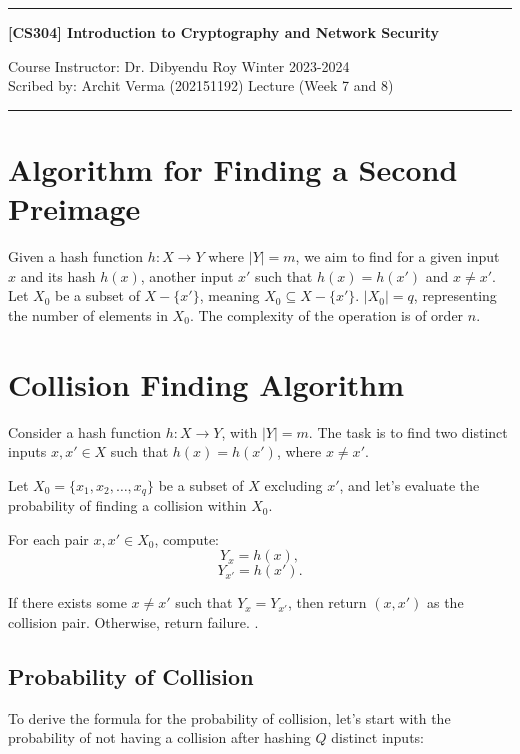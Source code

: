 \documentclass[11pt]{article}
\begin{document}
\noindent
\rule{\textwidth}{1pt}
\begin{center}
\bf [CS304] Introduction to Cryptography and Network Security
\end{center}
Course Instructor: Dr. Dibyendu Roy \hfill Winter 2023-2024\\
Scribed by: Archit Verma (202151192) \hfill Lecture (Week 7 and 8)
\\
\rule{\textwidth}{1pt}
\section{Algorithm for Finding a Second Preimage}

Given a hash function $h : X \rightarrow Y$ where $|Y| = m$, we aim to find for a given input $x$ and its hash $h(x)$, another input $x'$ such that $h(x) = h(x')$ and $x \neq x'$. Let $X_0$ be a subset of $X - \{x'\}$, meaning $X_0 \subseteq X - \{x'\}$. $|X_0| = q$, representing the number of elements in $X_0$. The complexity of the operation is of order $n$.

\section{Collision Finding Algorithm}

Consider a hash function \( h : X \rightarrow Y \), with \( |Y| = m \). The task is to find two distinct inputs \( x, x' \in X \) such that \( h(x) = h(x') \), where \( x \neq x' \).

Let \( X_0 = \{x_1, x_2, \ldots, x_q\} \) be a subset of \( X \) excluding \( x' \), and let's evaluate the probability of finding a collision within \( X_0 \).

For each pair \( x, x' \in X_0 \), compute:
\[ Y_x = h(x), \]
\[ Y_{x'} = h(x'). \]

If there exists some \( x \neq x' \) such that \( Y_x = Y_{x'} \), then return \( (x, x') \) as the collision pair. Otherwise, return failure.
.

\subsection{Probability of Collision}

To derive the formula for the probability of collision, let's start with the probability of not having a collision after hashing \( Q \) distinct inputs:
\end{document}
